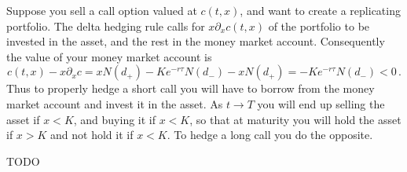 \begin{remark}
  Suppose you sell a call option valued at $c(t, x)$, and want to create a replicating portfolio.
  The delta hedging rule calls for $x \partial_x c(t, x)$ of the portfolio to be invested in the asset, and the rest in the money market account.
  Consequently the value of your money market account is
  \begin{equation*}
    c(t, x) - x \partial_x c
      = x N(d_+) - K e^{-r \tau} N(d_-) - x N(d_+)
      = - K e^{-r \tau} N(d_-) < 0\,.
  \end{equation*}
  Thus to properly hedge a short call you will have to borrow from the money market account and invest it in the asset.
  As $t \to T$ you will end up selling the asset if $x < K$, and buying it if $x < K$, so that at maturity you will hold the asset if $x > K$ and not hold it if $x < K$.
  To hedge a long call you do the opposite.
\end{remark}
\begin{remark}
  TODO
\end{remark}

